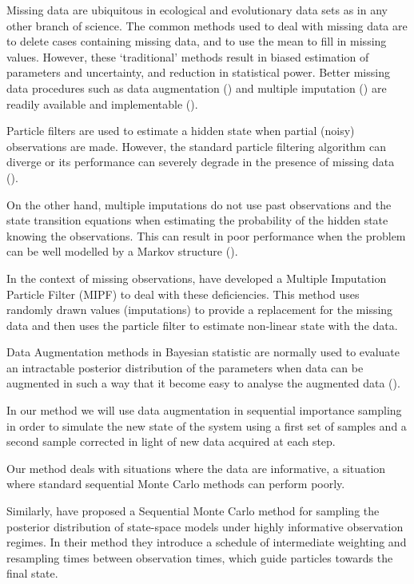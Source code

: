 Missing data are ubiquitous in ecological and evolutionary data sets as in any other branch of science. The common methods used to deal with missing data are to delete cases containing missing data, and to use the mean to fill in missing values. However, these ‘traditional’ methods result in biased estimation of parameters and uncertainty, and reduction in statistical power. Better missing data procedures such as data augmentation (\cite{Tanner}) and multiple imputation (\cite{RubinMI}) are readily available and implementable (\cite{Nakagawa}).

Particle filters are used to estimate a hidden state when partial (noisy) observations are made. However, the standard particle filtering algorithm can diverge or its performance can severely degrade in the presence of missing data (\cite{Zhang}).

On the other hand, multiple imputations do not use past observations and the state transition equations when estimating the probability of the hidden state knowing the observations. This can result in poor performance when the problem can be well modelled by a Markov structure (\cite{Zhang}).

In the context of missing observations, \cite{Zhang} have developed a Multiple Imputation Particle Filter (MIPF) to deal with these deficiencies. This method uses randomly drawn values (imputations) to provide a replacement for the missing data and then uses the particle filter to estimate non-linear state with the data.

Data Augmentation methods in Bayesian statistic are normally used to evaluate an intractable posterior distribution of the parameters when data can be augmented in such a way that it become easy to analyse the augmented data (\cite{Tanner}).

In our method we will use data augmentation in sequential importance sampling in order to simulate the new state of the system using a first set of samples and a second sample corrected in light of new data acquired at each step.

Our method deals with situations where the data are informative, a situation where standard sequential Monte Carlo methods can perform poorly. 

Similarly, \cite{Del Moral} have proposed a Sequential Monte Carlo method for sampling the posterior distribution of state-space models under highly informative observation regimes. In their method they introduce a schedule of intermediate weighting and resampling times between observation times, which guide particles towards the final state.

